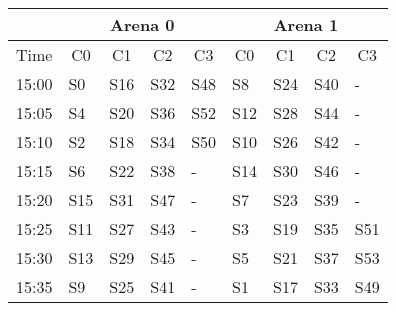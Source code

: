 \documentclass[12pt]{article}
\begin{document}
\begin{center}
    \begin{tabular}{|c|l|l|l|l|l|l|l|l|}
        \hline
        \multicolumn{1}{|c|}{} & \multicolumn{4}{|c|}{Arena 0} & \multicolumn{4}{|c|}{Arena 1} \\ \hline
        Time &
 \multicolumn{1}{|c|}{C0}  &
 \multicolumn{1}{|c|}{C1}  &
 \multicolumn{1}{|c|}{C2}  &
 \multicolumn{1}{|c|}{C3}  &
 \multicolumn{1}{|c|}{C0}  &
 \multicolumn{1}{|c|}{C1}  &
 \multicolumn{1}{|c|}{C2}  &
 \multicolumn{1}{|c|}{C3} \\ \hhline{|=|=|=|=|=|=|=|=|=|}
 15:00 & S0  & S16 & S32 & S48 & S8  & S24 & S40 & - \\ \hline
 15:05 & S4  & S20 & S36 & S52 & S12 & S28 & S44 & - \\ \hline
 15:10 & S2  & S18 & S34 & S50 & S10 & S26 & S42 & - \\ \hline
 15:15 & S6  & S22 & S38 & -   & S14 & S30 & S46 & - \\ \hline
 15:20 & S15 & S31 & S47 & -   & S7  & S23 & S39 & - \\ \hline
 15:25 & S11 & S27 & S43 & -   & S3  & S19 & S35 & S51 \\ \hline
 15:30 & S13 & S29 & S45 & -   & S5  & S21 & S37 & S53 \\ \hline
 15:35 & S9  & S25 & S41 & -   & S1  & S17 & S33 & S49 \\ \hline
    \end{tabular}
\end{center}
\end{document}
